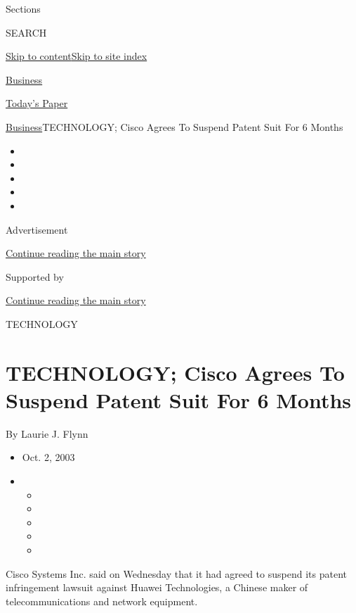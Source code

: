 Sections

SEARCH

\protect\hyperlink{site-content}{Skip to
content}\protect\hyperlink{site-index}{Skip to site index}

\href{https://www.nytimes.com/section/business}{Business}

\href{https://myaccount.nytimes.com/auth/login?response_type=cookie\&client_id=vi}{}

\href{https://www.nytimes.com/section/todayspaper}{Today's Paper}

\href{/section/business}{Business}\textbar{}TECHNOLOGY; Cisco Agrees To
Suspend Patent Suit For 6 Months

\begin{itemize}
\item
\item
\item
\item
\item
\end{itemize}

Advertisement

\protect\hyperlink{after-top}{Continue reading the main story}

Supported by

\protect\hyperlink{after-sponsor}{Continue reading the main story}

TECHNOLOGY

\hypertarget{technology-cisco-agrees-to-suspend-patent-suit-for-6-months}{%
\section{TECHNOLOGY; Cisco Agrees To Suspend Patent Suit For 6
Months}\label{technology-cisco-agrees-to-suspend-patent-suit-for-6-months}}

By Laurie J. Flynn

\begin{itemize}
\item
  Oct. 2, 2003
\item
  \begin{itemize}
  \item
  \item
  \item
  \item
  \item
  \end{itemize}
\end{itemize}

Cisco Systems Inc. said on Wednesday that it had agreed to suspend its
patent infringement lawsuit against Huawei Technologies, a Chinese maker
of telecommunications and network equipment.

